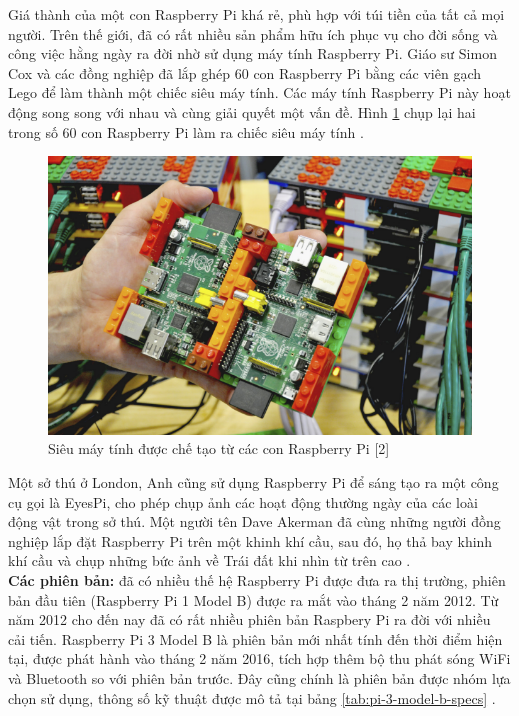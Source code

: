 \documentclass[12pt,a4paper,oneside]{extbook}
\begin{document}
\noindent
Giá thành của một con Raspberry Pi khá rẻ, phù hợp với túi tiền của tất cả mọi người. Trên thế giới, đã có rất nhiều sản phẩm hữu ích phục vụ cho đời sống và công việc hằng ngày ra đời nhờ sử dụng máy tính Raspberry Pi. Giáo sư Simon Cox và các đồng nghiệp đã lắp ghép 60 con Raspberry Pi bằng các viên gạch Lego để làm thành một chiếc siêu máy tính. Các máy tính Raspberry Pi này hoạt động song song với nhau và cùng giải quyết một vấn đề. Hình \ref{fig:4-Sieu-may-tinh} chụp lại hai trong số 60 con Raspberry Pi làm ra chiếc siêu máy tính \cite{pi-for-dummies}.

\begin{figure}[h]
  \centering
     \includegraphics[scale=0.5]{4-Sieu-may-tinh}
  \caption{Siêu máy tính được chế tạo từ các con Raspberry Pi [2]}\label{fig:4-Sieu-may-tinh}
\end{figure}

\noindent
Một sở thú ở London, Anh cũng sử dụng Raspberry Pi để sáng tạo ra một công cụ gọi là EyesPi, cho phép chụp ảnh các hoạt động thường ngày của các loài động vật trong sở thú. Một người tên Dave Akerman đã cùng những người đồng nghiệp lắp đặt Raspberry Pi trên một khinh khí cầu, sau đó, họ thả bay khinh khí cầu và chụp những bức ảnh về Trái đất khi nhìn từ trên cao \cite{pi-for-dummies}.\\

\noindent
\textbf{Các phiên bản:} đã có nhiều thế hệ Raspberry Pi được đưa ra thị trường, phiên bản đầu tiên (Raspberry Pi 1 Model B) được ra mắt vào tháng 2 năm 2012. Từ năm 2012 cho đến nay đã có rất nhiều phiên bản Raspbery Pi ra đời với nhiều cải tiến. Raspberry Pi 3 Model B là phiên bản mới nhất tính đến thời điểm hiện tại, được phát hành vào tháng 2 năm 2016, tích hợp thêm bộ thu phát sóng WiFi và Bluetooth so với phiên bản trước. Đây cũng chính là phiên bản được nhóm lựa chọn sử dụng, thông số kỹ thuật được mô tả tại bảng \ref{tab:pi-3-model-b-specs} \cite{pi-wiki}.
\end{document}
